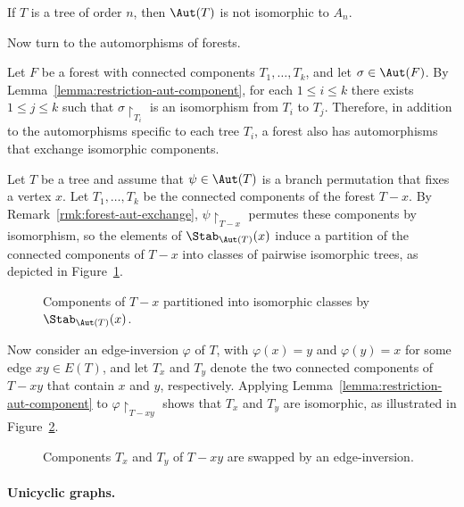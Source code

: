 \begin{corollary}[Folklore]\label{cor:autT_is_not_An}
    If $T$ is a tree of order $n$, then $\Aut(T)$ is not isomorphic to $A_n$.
\end{corollary}

Now turn to the automorphisms of forests.

\begin{remark}\label{rmk:forest-aut-exchange}
    Let $F$ be a forest with connected components $T_1,\dots,T_k$, and let $\sigma\in\Aut(F)$.
    By Lemma~\ref{lemma:restriction-aut-component}, for each $1\leq i\leq k$ there exists $1\leq j\leq k$ such that $\sigma\restriction_{T_i}$ is an isomorphism from $T_i$ to $T_j$.
    Therefore, in addition to the automorphisms specific to each tree $T_i$, a forest also has automorphisms that exchange isomorphic components.
\end{remark}

Let $T$ be a tree and assume that $\psi\in\Aut(T)$ is a branch permutation that fixes a vertex $x$.
Let $T_1,\dots,T_k$ be the connected components of the forest $T-x$.
By Remark~\ref{rmk:forest-aut-exchange}, $\psi\restriction_{T-x}$ permutes these components by isomorphism, so the elements of $\Stab_{\Aut(T)}(x)$ induce a partition of the connected components of $T-x$ into classes of pairwise isomorphic trees, as depicted in Figure~\ref{fig:classes-of-tree}.

\begin{figure}[ht]
    \centering
    
    \caption{Components of $T-x$ partitioned into isomorphic classes by $\Stab_{\Aut(T)}(x)$.}
    \label{fig:classes-of-tree}
\end{figure}

Now consider an edge-inversion $\varphi$ of $T$, with $\varphi(x)=y$ and $\varphi(y)=x$ for some edge $xy\in E(T)$, and let $T_x$ and $T_y$ denote the two connected components of $T-xy$ that contain $x$ and $y$, respectively.
Applying Lemma~\ref{lemma:restriction-aut-component} to $\varphi\restriction_{T-xy}$ shows that $T_x$ and $T_y$ are isomorphic, as illustrated in Figure~\ref{fig:two-isomorphic-trees}.

\begin{figure}[ht]
    \centering
    
    \caption{Components $T_x$ and $T_y$ of $T-xy$ are swapped by an edge-inversion.}
    \label{fig:two-isomorphic-trees}
\end{figure}

\paragraph{Unicyclic graphs.}\label{par:unicyclic}


